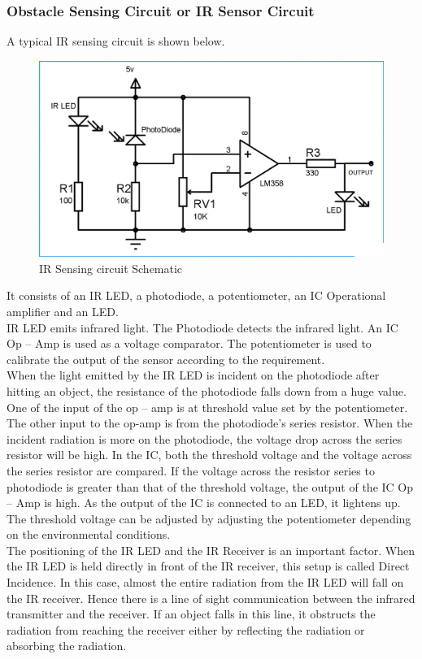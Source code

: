 \subsubsection{Obstacle Sensing Circuit or IR Sensor Circuit}
A typical IR sensing circuit is shown below.\\
\begin{figure}[h]
\newpage
\center
\includegraphics[scale=0.4]{IRsensorcircuit.jpg} 
\caption{IR Sensing circuit Schematic}
\end{figure}
It consists of an IR LED, a photodiode, a potentiometer, an IC Operational amplifier and an LED.\\
IR LED emits infrared light. The Photodiode detects the infrared light. An IC Op – Amp is used as a voltage comparator. The potentiometer is used to calibrate the output of the sensor according to the requirement.\\
When the light emitted by the IR LED is incident on the photodiode after hitting an object, the resistance of the photodiode falls down from a huge value. One of the input of the op – amp is at threshold value set by the potentiometer. The other input to the op-amp is from the photodiode’s series resistor. When the incident radiation is more on the photodiode, the voltage drop across the series resistor will be high. In the IC, both the threshold voltage and the voltage across the series resistor are compared. If the voltage across the resistor series to photodiode is greater than that of the threshold voltage, the output of the IC Op – Amp is high. As the output of the IC is connected to an LED, it lightens up. The threshold voltage can be adjusted by adjusting the potentiometer depending on the environmental conditions.\\
The positioning of the IR LED and the IR Receiver is an important factor. When the IR LED is held directly in front of the IR receiver, this setup is called Direct Incidence. In this case, almost the entire radiation from the IR LED will fall on the IR receiver. Hence there is a line of sight communication between the infrared transmitter and the receiver. If an object falls in this line, it obstructs the radiation from reaching the receiver either by reflecting the radiation or absorbing the radiation.\\
